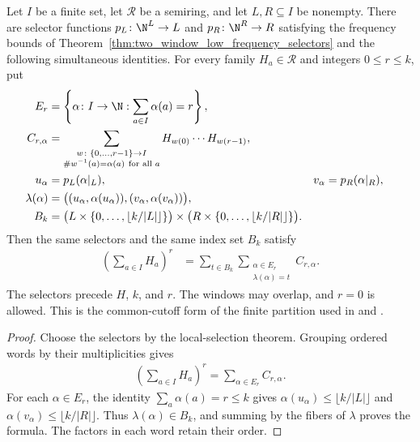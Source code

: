 \begin{theorem}
    \label{thm:two_window_common_cutoff_partition}
    \leanok
    Let $I$ be a finite set, let $\mathcal R$ be a semiring, and let
    $L,R\subseteq I$ be nonempty. There are selector functions
    $p_L\colon\N^L\to L$ and $p_R\colon\N^R\to R$ satisfying the
    frequency bounds of Theorem~\ref{thm:two_window_low_frequency_selectors}
    and the following simultaneous identities.
    For every family $H_a\in\mathcal R$ and integers $0\le r\le k$, put
    \begin{align*}
        E_r             & =\left\{\alpha\colon I\to\N:\sum_{a\in I}\alpha(a)=r\right\},                    \\
        C_{r,\alpha}    & =\sum_{\substack{w\colon\{0,\ldots,r-1\}\to I                                    \\
                \#w^{-1}(a)=\alpha(a)\ \text{for all }a}}
        H_{w(0)}\cdots H_{w(r-1)},                                                                         \\
        u_\alpha        & =p_L(\alpha|_L),
                        & v_\alpha                                                      & =p_R(\alpha|_R), \\
        \lambda(\alpha) & =\bigl((u_\alpha,\alpha(u_\alpha)),
        (v_\alpha,\alpha(v_\alpha))\bigr),                                                                 \\
        B_k             & =\bigl(L\times\{0,\ldots,\lfloor k/|L|\rfloor\}\bigr)
        \times\bigl(R\times\{0,\ldots,\lfloor k/|R|\rfloor\}\bigr).
    \end{align*}
    Then the same selectors and the same index set $B_k$ satisfy
    \begin{align*}
        \left(\sum_{a\in I}H_a\right)^r
         & =\sum_{t\in B_k}
        \sum_{\substack{\alpha\in E_r \\\lambda(\alpha)=t}}C_{r,\alpha}.
    \end{align*}
    The selectors precede $H$, $k$, and $r$. The windows may overlap, and
    $r=0$ is allowed. This is the common-cutoff form of the finite partition
    used in \cite[Lemma~4.2]{Arad2013AreaLaw} and
    \cite[Proposition~5.7]{Arad2016RigorousRG}.
\end{theorem}
\begin{proof}\leanok
    Choose the selectors by the local-selection theorem. Grouping ordered
    words by their multiplicities gives
    \begin{align*}
        \left(\sum_{a\in I}H_a\right)^r=\sum_{\alpha\in E_r}C_{r,\alpha}.
    \end{align*}
    For each $\alpha\in E_r$, the identity
    $\sum_a\alpha(a)=r\le k$ gives
    $\alpha(u_\alpha)\le\lfloor k/|L|\rfloor$ and
    $\alpha(v_\alpha)\le\lfloor k/|R|\rfloor$.
    Thus $\lambda(\alpha)\in B_k$, and summing by the fibers of
    $\lambda$ proves the formula. The factors in each word retain their order.
\end{proof}

